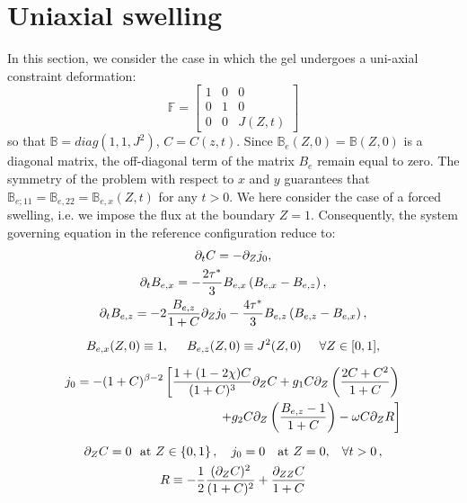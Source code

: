 \documentclass[12pt]{extarticle}
\newcommand{\F}{\ensuremath{\mathbb{F}}}
\newcommand{\B}{\ensuremath{\mathbb{B}}}
\begin{document}
\section{Uniaxial swelling}

In this section, we consider the case in which the gel undergoes a uni-axial constraint deformation:
\begin{equation}
\F= \begin{bmatrix}
1 &0&0\\
0&1&0\\
0&0& J(Z,t)
\end{bmatrix}                                                                        
\end{equation}
so that $\B=diag(1,1,J^2)$, $C=C(z,t)$. Since $\B_e(Z,0)=\B(Z,0)$ is a diagonal matrix, the off-diagonal term of the matrix $B_e$ remain equal to zero. The symmetry of the problem with respect to $x$ and $y$ guarantees that $\B_{e;11}=\B_{e,22}=\B_{e,x}(Z,t)$ for any $t>0$. We here consider the case of a forced swelling, i.e. we impose the flux at the boundary $Z=1$. Consequently, the system governing equation in the reference configuration reduce to:
\begin{gather}
\partial_t C = -\partial_Z j_0,\\
\partial_t B_{e,x} = -\frac{2\tau^*}{3} B_{e,x} \left(B_{e,x}-B_{e,z}\right),\label{din1}\\
\partial_t B_{e,z} = -2\frac{B_{e,z}}{1+C}\partial_Z j_0-\frac{4\tau^*}{3} B_{e,z} \left(B_{e,z}-B_{e,x}\right),\label{din2}\\[2mm]
B_{e,x}(Z,0)\equiv 1, \hspace{5mm} B_{e,z}(Z,0)\equiv J^2(Z,0) \hspace{5mm} \forall Z\in[0,1],\\[2mm]
\begin{aligned}
j_0= -(1+C)^{\beta-2}\left[\frac{1+(1-2\chi)C}{(1+C)^3} \partial_Z C+g_1 C \partial_Z\left(\frac{2C+C^2}{1+C}\right)\right.\\
\left. +g_2 C \partial_Z\left(\frac{B_{e,z}-1}{1+C}\right) -\omega C \partial_Z R\right]
\end{aligned}\\[2mm]
\partial_Z C = 0 \ \  \text{at } Z\in\left\{0,1\right\},\ \ \  j_0=0\ \ \ \text{at } Z=0,\hspace{3mm}\forall t>0\, ,  \\
R\equiv-\frac{1}{2}\frac{(\partial_ZC)^2}{(1+C)^2}+\frac{\partial_{ZZ}C}{1+C}
\end{gather}
\end{document}
